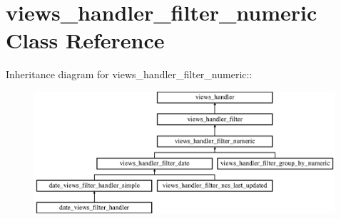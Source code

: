 \hypertarget{classviews__handler__filter__numeric}{
\section{views\_\-handler\_\-filter\_\-numeric Class Reference}
\label{classviews__handler__filter__numeric}
}
Inheritance diagram for views\_\-handler\_\-filter\_\-numeric::\begin{figure}[H]
\begin{center}
\leavevmode
\includegraphics[height=4.53441cm]{classviews__handler__filter__numeric}
\end{center}
\end{figure}
